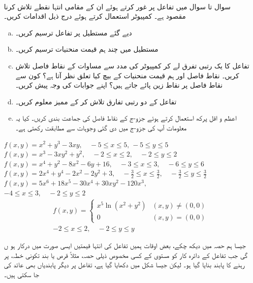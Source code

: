 \\
سوال  تا سوال  میں تفاعل پر غور کرتے ہوئے  ان کے مقامی انتہا  نقطے تلاش کرنا مقصود ہے۔ کمپیوٹر استعمال کرتے ہوئے درج ذیل اقدامات کریں۔
\begin{enumerate}[a.]
\item
دیے گئے  مستطیل پر تفاعل ترسیم کریں۔
\item
مستطیل میں چند ہم قیمت منحنیات ترسیم کریں۔
\item
تفاعل کا یک رتبی تفرق لے کر  کمپیوٹر کی مدد سے  مساوات  کے  نقاط فاصل تلاش کریں۔ نقاط فاصل اور ہم قیمت منحنیات کے بیچ  کیا تعلق نظر آتا ہے؟ کون سے نقاط فاصل پر نقاط زین پائے جاتے ہیں؟ اپنے جوابات کی وجہ پیش کریں۔ 
\item
تفاعل کے دو رتبی تفارق تلاش کر کے ممیز  معلوم کریں۔
\item
اعظم و اقل  پرکھ استعمال کرتے ہوئے جزو-ج کے نقاط فاصل کی جماعت بندی کریں۔ کیا  یہ   معلومات آپ کی جزو-ج میں دی گئی وجوہات سے مطابقت رکھتی ہے۔
\end{enumerate}

$f(x,y)=x^2+y^3-3xy,\quad -5\le x\le 5,\, -5\le y\le 5$
$f(x,y)=x^3-3xy^2+y^2,\quad -2\le x\le 2,\quad -2\le y\le 2$
$f(x,y)=x^4+y^2-8x^2-6y+16,\quad -3\le x\le 3,\quad -6\le y\le 6$
$f(x,y)=2x^4+y^4-2x^2-2y^2+3,\quad -\frac{3}{2}\le x\le \frac{3}{2},\quad -\frac{3}{2}\le y\le \frac{3}{2}$
$f(x,y)=5x^6+18x^5-30x^4+30xy^2-120x^3,$\\
$ -4\le x\le 3,\quad -2\le y\le 2$
\begin{align*}
&f(x,y)=\begin{cases}x^5\ln(x^2+y^2) &(x,y)\ne (0,0)\\ 0&(x,y)=(0,0)\end{cases}\\
&-2\le x\le 2,\quad -2\le y\le y
\end{align*}


جیسا ہم  حصہ  میں دیکھ چکے،  بعض اوقات ہمیں تفاعل کی انتہا قیمتیں ایسی صورت میں   درکار ہو ں گی جب تفاعل کے دائرہ کار کو مستوی کے کسی مخصوص  ذیلی  حصہ، مثلاً قرص یا  بند تکونی خطہ،  پر رہنے کا پابند بنایا    گیا ہو۔  لیکن جیسا شکل    میں دکھایا گیا ہے،   تفاعل پر  دیگر  پابندیاں بھی عائد کی جا سکتی ہیں۔

